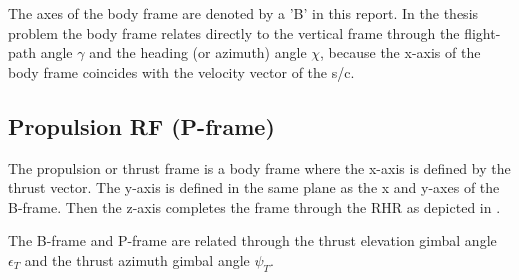The axes of the body frame are denoted by a 'B' in this report. In the thesis problem the body frame relates directly to the vertical frame through the flight-path angle $\gamma$ and the heading (or azimuth) angle $\chi$, because the x-axis of the body frame coincides with the velocity vector of the \ac{s/c}. 


 








\subsection{Propulsion \ac{RF} (P-frame)}
\label{subsec:propframe}
The propulsion or thrust frame is a body frame where the x-axis is defined by the thrust vector. The y-axis is defined in the same plane as the x and y-axes of the B-frame. Then the z-axis completes the frame through the \ac{RHR} as depicted in .

The B-frame and P-frame are related through the thrust elevation gimbal angle $\epsilon_{T}$ and the thrust azimuth gimbal angle $\psi_{T}$. 





